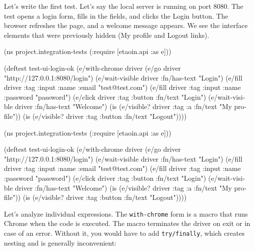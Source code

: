 
Let's write the first test. Let's say the local server is running on port 8080. The test opens a login form, fills in the fields, and clicks the Login button. The browser refreshes the page, and a welcome message appears. We see the interface elements that were previously hidden (My profile and Logout links).

\ifnarrow

\begin{english}
  \begin{clojure}
(ns project.integration-tests
  (:require [etaoin.api :as e]))

(deftest test-ui-login-ok
  (e/with-chrome {} driver
    (e/go driver
      "http://127.0.0.1:8080/login")
    (e/wait-visible driver
      {:fn/has-text "Login"})
    (e/fill driver
      {:tag :input :name :email}
      "test@test.com")
    (e/fill driver
      {:tag :input :name :password}
      "password")
    (e/click driver
      {:tag :button :fn/text "Login"})
    (e/wait-visible driver
      {:fn/has-text "Welcome"})
    (is (e/visible? driver
          {:tag :a
           :fn/text "My profile"}))
    (is (e/visible? driver
          {:tag :button
           :fn/text "Logout"}))))
  \end{clojure}
\end{english}

\else

\begin{english}
  \begin{clojure}
(ns project.integration-tests
  (:require [etaoin.api :as e]))

(deftest test-ui-login-ok
  (e/with-chrome {} driver
    (e/go driver "http://127.0.0.1:8080/login")
    (e/wait-visible driver {:fn/has-text "Login"})
    (e/fill driver {:tag :input :name :email} "test@test.com")
    (e/fill driver {:tag :input :name :password} "password")
    (e/click driver {:tag :button :fn/text "Login"})
    (e/wait-visible driver {:fn/has-text "Welcome"})
    (is (e/visible? driver {:tag :a :fn/text "My profile"}))
    (is (e/visible? driver {:tag :button :fn/text "Logout"}))))
  \end{clojure}
\end{english}

\fi

Let's analyze individual expressions. The \verb|with-chrome| form is a macro that runs Chrome when the code is executed. The macro terminates the driver on exit or in case of an error. Without it, you would have to add \verb|try/finally|, which creates nesting and is generally inconvenient:

